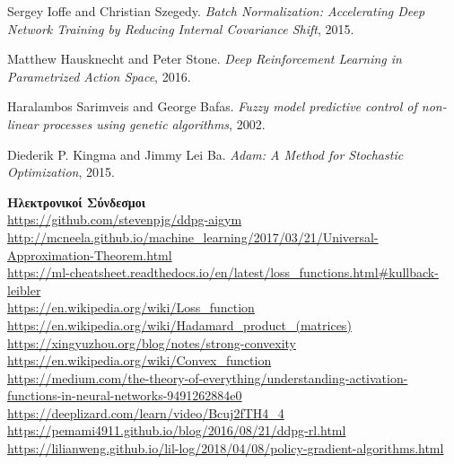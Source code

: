 \documentclass[11pt]{article} %
\numberwithin{equation}{subsection}
\begin{document}
\begin{thebibliography}{9}
Sergey Ioffe and Christian Szegedy. \textit{Batch Normalization: Accelerating Deep Network Training by Reducing Internal Covariance Shift}, 2015.

Matthew Hausknecht and Peter Stone. \textit{Deep Reinforcement Learning in Parametrized Action Space}, 2016.

Haralambos Sarimveis and George Bafas. \textit{Fuzzy model predictive control of non-linear processes using genetic algorithms}, 2002.

Diederik P. Kingma and Jimmy Lei Ba. \textit{Adam: A Method for Stochastic Optimization}, 2015.

\end{thebibliography}

\newpage

\textbf{Ηλεκτρονικοί Σύνδεσμοι}\\

\url{https://github.com/stevenpjg/ddpg-aigym}\\

\url{http://mcneela.github.io/machine_learning/2017/03/21/Universal-Approximation-Theorem.html}\\

\url{https://ml-cheatsheet.readthedocs.io/en/latest/loss_functions.html#kullback-leibler}\\

\url{https://en.wikipedia.org/wiki/Loss_function}\\

\url{https://en.wikipedia.org/wiki/Hadamard_product_(matrices)}\\

\url{https://xingyuzhou.org/blog/notes/strong-convexity}\\

\url{https://en.wikipedia.org/wiki/Convex_function}\\

\url{https://medium.com/the-theory-of-everything/understanding-activation-functions-in-neural-networks-9491262884e0}\\

\url{https://deeplizard.com/learn/video/Bcuj2fTH4_4}\\

\url{https://pemami4911.github.io/blog/2016/08/21/ddpg-rl.html}\\

\url{https://lilianweng.github.io/lil-log/2018/04/08/policy-gradient-algorithms.html}\\
\end{document}
